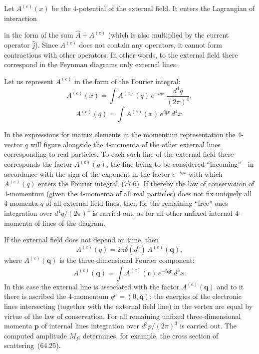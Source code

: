 Let $A^{(e)}(x)$ be the 4-potential of the external field. It enters the Lagrangian of interaction

in the form of the sum $\hat{A} + A^{(e)}$ (which is also multiplied by the current operator $\hat{j}$). Since $A^{(e)}$ does not contain any operators, it cannot form contractions with other operators. In other words, to the external field there correspond in the Feynman diagrams only external lines.

Let us represent $A^{(e)}$ in the form of the Fourier integral:
\begin{equation}
A^{(e)}(x) = \int A^{(e)}(q)\,e^{-iqx}\,\frac{d^4q}{(2\pi)^4},
\tag{77.6}
\end{equation}
\[
A^{(e)}(q) = \int A^{(e)}(x)\,e^{iqx}\,d^4x.
\]

In the expressions for matrix elements in the momentum representation the 4-vector $q$ will figure alongside the 4-momenta of the other external lines corresponding to real particles. To each such line of the external field there corresponds the factor $A^{(e)}(q)$, the line being to be considered ``incoming''---in accordance with the sign of the exponent in the factor $e^{-iqx}$ with which $A^{(e)}(q)$ enters the Fourier integral~(77.6). If thereby the law of conservation of 4-momentum (given the 4-momenta of all real particles) does not fix uniquely all 4-momenta $q$ of all external field lines, then for the remaining ``free'' ones integration over $d^4q/(2\pi)^4$ is carried out, as for all other unfixed internal 4-momenta of lines of the diagram.

If the external field does not depend on time, then
\begin{equation}
A^{(e)}(q) = 2\pi\delta(q^0)\,A^{(e)}(\mathbf{q}),
\tag{77.7}
\end{equation}
where $A^{(e)}(\mathbf{q})$ is the three-dimensional Fourier component:
\begin{equation}
A^{(e)}(\mathbf{q}) = \int A^{(e)}(\mathbf{r})\,e^{-i\mathbf{q}\mathbf{r}}\,d^3x.
\tag{77.8}
\end{equation}
In this case the external line is associated with the factor $A^{(e)}(\mathbf{q})$ and to it there is ascribed the 4-momentum $q^\mu = (0,\mathbf{q})$; the energies of the electronic lines intersecting (together with the external field line) in the vertex are equal by virtue of the law of conservation. For all remaining unfixed three-dimensional momenta $\mathbf{p}$ of internal lines integration over $d^3p/(2\pi)^3$ is carried out. The computed amplitude $M_{fi}$ determines, for example, the cross section of scattering~(64.25).

